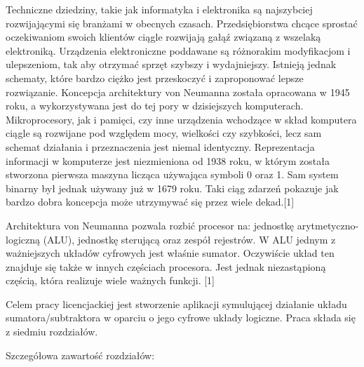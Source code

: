 \documentclass[12pt, a4paper, onside, polish]{article}				%
\begin{document}
Techniczne dziedziny, takie jak informatyka i elektronika są najszybciej rozwijającymi się branżami w obecnych czasach. Przedsiębiorstwa chcące sprostać oczekiwaniom swoich klientów ciągle rozwijają gałąź związaną z wszelaką elektroniką. Urządzenia elektroniczne poddawane są różnorakim modyfikacjom i ulepszeniom, tak aby otrzymać sprzęt szybszy i wydajniejszy. Istnieją jednak schematy, które bardzo ciężko jest przeskoczyć i zaproponować lepsze rozwiązanie. Koncepcja architektury von Neumanna została opracowana w 1945 roku, a wykorzystywana jest do tej pory w dzisiejszych komputerach. Mikroprocesory, jak i pamięci, czy inne urządzenia wchodzące w skład komputera ciągle są rozwijane pod względem mocy, wielkości czy szybkości, lecz sam schemat działania i przeznaczenia jest niemal identyczny. Reprezentacja informacji w komputerze jest niezmieniona od 1938 roku, w którym została stworzona pierwsza maszyna licząca używająca symboli 0 oraz 1. Sam system binarny był jednak używany już w 1679 roku. Taki ciąg zdarzeń pokazuje jak bardzo dobra koncepcja może utrzymywać się przez wiele dekad.[1]

Architektura von Neumanna pozwala rozbić procesor na: jednostkę arytmetyczno-logiczną (ALU), jednostkę sterującą oraz zespół rejestrów. W ALU jednym z ważniejszych układów cyfrowych jest właśnie sumator. Oczywiście układ ten znajduje się także w innych częściach procesora. Jest jednak niezastąpioną częścią, która realizuje wiele ważnych funkcji. [1]\newline

Celem pracy licencjackiej jest stworzenie aplikacji symulującej działanie układu sumatora/subtraktora w oparciu o jego cyfrowe układy logiczne. Praca składa się z siedmiu rozdziałów.\newline

Szczegółowa zawartość rozdziałów:
\end{document}
